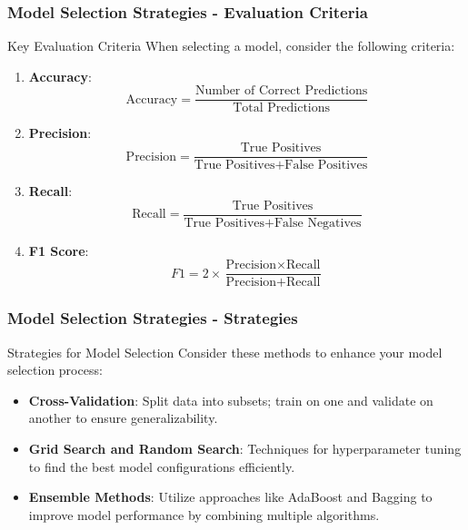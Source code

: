 \documentclass[aspectratio=169]{beamer}
\begin{document}
\begin{frame}[fragile]
    \frametitle{Model Selection Strategies - Evaluation Criteria}
    \begin{block}{Key Evaluation Criteria}
        When selecting a model, consider the following criteria:
        \begin{enumerate}
            \item \textbf{Accuracy}: 
            \begin{equation}
                \text{Accuracy} = \frac{\text{Number of Correct Predictions}}{\text{Total Predictions}}
            \end{equation}
            \item \textbf{Precision}:
            \begin{equation}
                \text{Precision} = \frac{\text{True Positives}}{\text{True Positives} + \text{False Positives}}
            \end{equation}
            \item \textbf{Recall}:
            \begin{equation}
                \text{Recall} = \frac{\text{True Positives}}{\text{True Positives} + \text{False Negatives}}
            \end{equation}
            \item \textbf{F1 Score}:
            \begin{equation}
                F1 = 2 \times \frac{\text{Precision} \times \text{Recall}}{\text{Precision} + \text{Recall}}
            \end{equation}
        \end{enumerate}
    \end{block}
\end{frame}

\begin{frame}[fragile]
    \frametitle{Model Selection Strategies - Strategies}
    \begin{block}{Strategies for Model Selection}
        Consider these methods to enhance your model selection process:
        \begin{itemize}
            \item \textbf{Cross-Validation}: Split data into subsets; train on one and validate on another to ensure generalizability.
            \item \textbf{Grid Search and Random Search}: Techniques for hyperparameter tuning to find the best model configurations efficiently.
            \item \textbf{Ensemble Methods}: Utilize approaches like AdaBoost and Bagging to improve model performance by combining multiple algorithms.
        \end{itemize}
    \end{block}
\end{frame}
\end{document}
